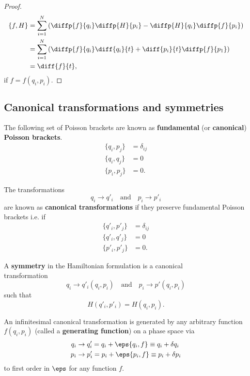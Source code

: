 \documentclass[12pt, a4paper]{article}
\begin{document}
\begin{proof}
    \[\begin{aligned}
        \{f,H\} &= \sum_{i=1}^{N} \left( \diffp{f}{{q_i}} \diffp{H}{{p_i}} - \diffp{H}{{q_i}} \diffp{f}{{p_i}} \right) \\
        &= \sum_{i=1}^{N} \left( \diffp{f}{{q_i}} \diff{{q_i}}{t} + \diff{{p_i}}{t} \diffp{f}{{p_1}} \right) \\
        &= \diff{f}{t},
    \end{aligned}\]
    if \(f = f(q_i,p_i)\).
\end{proof}

\subsection{Canonical transformations and symmetries}

\begin{definition}
    The following set of Poisson brackets are known as \textbf{fundamental} (or \textbf{canonical}) \textbf{Poisson brackets}. 
    \[\begin{aligned}
        \{q_i,p_j\} &= \delta_{ij} \\
        \{q_i,q_j\} &= 0 \\
        \{p_i,p_j\} &= 0.
    \end{aligned}\]
\end{definition}

\begin{definition}
    The transformations 
    \[q_i \to q'_i \quad \text{and} \quad p_i \to p'_i\]
    are known as \textbf{canonical transformations} if they preserve fundamental Poisson brackets i.e. if 
    \[\begin{aligned}
        \{q'_i,p'_j\} &= \delta_{ij} \\
        \{q'_i,q'_j\} &= 0 \\
        \{p'_i,p'_j\} &= 0.
    \end{aligned}\]
\end{definition}

\begin{definition}
    A \textbf{symmetry} in the Hamiltonian formulation is a canonical \\ transformation 
    \[q_i \to q'_i(q_i,p_i) \quad \text{and} \quad p_i \to p'(q_i,p_i)\]
    such that 
    \[H(q'_i,p'_i) = H(q_i,p_i).\]
\end{definition}

\begin{mdthm}
    An infinitesimal canonical transformation is generated by any arbitrary function \(f(q_i,p_i)\) (called a \textbf{generating function}) on a phase space via
    \[\begin{aligned}
        q_i &\to q_i' = q_i + \eps\{q_i,f\} \equiv q_i +\delta q_i \\
        p_i &\to p_i' = p_i +\eps\{p_i,f\} \equiv p_i +\delta p_i
    \end{aligned}\]
    to first order in \(\eps\) for any function \(f\).
\end{mdthm}
\end{document}
